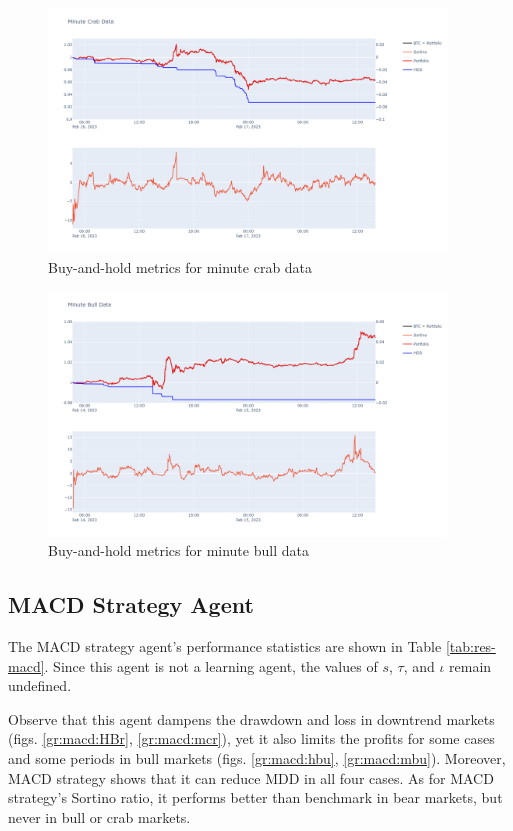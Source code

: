 \begin{figure}[H]
    \centering
    \includegraphics[width=0.94\textwidth]{graphics/results/01_minute_crab.png}
    \caption{Buy-and-hold metrics for minute crab data}
    \label{gr:bih:mcr}
\end{figure}

\begin{figure}[H]
    \centering
    \includegraphics[width=0.94\textwidth]{graphics/results/01_minute_bull.png}
    \caption{Buy-and-hold metrics for minute bull data}
    \label{gr:bih:mbu}
\end{figure}

\subsection{MACD Strategy Agent}
The MACD strategy agent's performance statistics are shown in Table \ref{tab:res-macd}. Since this agent is not a learning agent, the values of $s$, $\tau$, and $\iota$ remain undefined.

Observe that this agent dampens the drawdown and loss in downtrend markets (figs. \ref{gr:macd:HBr}, \ref{gr:macd:mcr}), yet it also limits the profits for some cases and some periods in bull markets (figs. \ref{gr:macd:hbu}, \ref{gr:macd:mbu}). Moreover, MACD strategy shows that it can reduce MDD in all four cases. As for MACD strategy's Sortino ratio, it performs better than benchmark in bear markets, but never in bull or crab markets.

